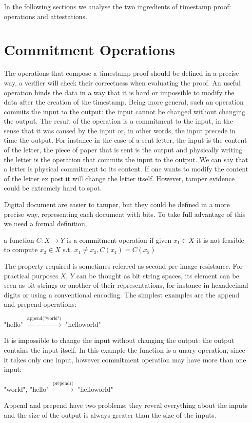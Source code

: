 In the following sections we analyse the two ingredients of timestamp proof: operations and attestations.

\section{Commitment Operations}

The operations that compose a timestamp proof should be defined in a precise way, a verifier will check their correctness when evaluating the proof. An useful operation binds the data in a way that it is hard or impossible to modify the data after the creation of the timestamp. Being more general, such an operation commits the input to the output: the input cannot be changed without changing the output. The result of the operation is a commitment to the input, in the sense that it was caused by the input or, in other words, the input precede in time the output.
For instance in the case of a sent letter, the input is the content of the letter, the piece of paper that is sent is the output and physically writing the letter is the operation that commits the input to the output. We can say that a letter is physical commitment to its content. If one wants to modify the content of the letter ex post it will change the letter itself. However, tamper evidence could be extremely hard to spot.

Digital document are easier to tamper, but they could be defined in a more precise way, representing each document with bits. To take full advantage of this we need a formal definition,
\begin{mydef}
	a function $C:X \rightarrow Y$ is a commitment operation if given $x_1 \in X$ it is not feasible to compute $x_2 \in X$ s.t. $x_1 \neq x_2, C(x_1)=C(x_2)$
\end{mydef}
The property required is sometimes referred as second pre-image resistance. For practical purposes $X$, $Y$ can be thought as bit string spaces, its element can be seen as bit strings or another of their representations, for instance in hexadecimal digits or using a conventional encoding.
The simplest examples are the append and prepend operations:

\begin{myexample}
	"hello" $\xrightarrow{\text{append("world")}}$ "helloworld"
\end{myexample}
It is impossible to change the input without changing the output: the output contains the input itself. In this example the function is a unary operation, since it takes only one input, however commitment operation may have more than one input:
\begin{myexample}
	"world", "hello" $\xrightarrow{\text{prepend()}}$ "helloworld"
\end{myexample}
Append and prepend have two problems: they reveal everything about the inputs and the size of the output is always greater than the size of the inputs. 

